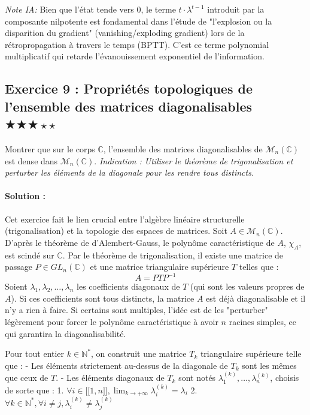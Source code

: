 \documentclass[11pt,a4paper]{article}
\begin{document}
\textit{Note IA:} Bien que l'état tende vers $0$, le terme $t \cdot \lambda^{t-1}$ introduit par la composante nilpotente est fondamental dans l'étude de "l'explosion ou la disparition du gradient" (vanishing/exploding gradient) lors de la rétropropagation à travers le temps (BPTT). C'est ce terme polynomial multiplicatif qui retarde l'évanouissement exponentiel de l'information.

\vspace{1cm}
\subsection*{Exercice 9 : Propriétés topologiques de l'ensemble des matrices diagonalisables $\bigstar\bigstar\bigstar\star\star$}

Montrer que sur le corps $\mathbb{C}$, l'ensemble des matrices diagonalisables de $\mathcal{M}_n(\mathbb{C})$ est dense dans $\mathcal{M}_n(\mathbb{C})$.
\textit{Indication : Utiliser le théorème de trigonalisation et perturber les éléments de la diagonale pour les rendre tous distincts.}

\paragraph*{Solution :}

Cet exercice fait le lien crucial entre l'algèbre linéaire structurelle (trigonalisation) et la topologie des espaces de matrices.
Soit $A \in \mathcal{M}_n(\mathbb{C})$.
D'après le théorème de d'Alembert-Gauss, le polynôme caractéristique de $A$, $\chi_A$, est scindé sur $\mathbb{C}$.
Par le théorème de trigonalisation, il existe une matrice de passage $P \in GL_n(\mathbb{C})$ et une matrice triangulaire supérieure $T$ telles que :
$$ A = P T P^{-1} $$
Soient $\lambda_1, \lambda_2, \ldots, \lambda_n$ les coefficients diagonaux de $T$ (qui sont les valeurs propres de $A$).
Si ces coefficients sont tous distincts, la matrice $A$ est déjà diagonalisable et il n'y a rien à faire.
Si certains sont multiples, l'idée est de les "perturber" légèrement pour forcer le polynôme caractéristique à avoir $n$ racines simples, ce qui garantira la diagonalisabilité.

Pour tout entier $k \in \mathbb{N}^*$, on construit une matrice $T_k$ triangulaire supérieure telle que :
- Les éléments strictement au-dessus de la diagonale de $T_k$ sont les mêmes que ceux de $T$.
- Les éléments diagonaux de $T_k$ sont notés $\lambda_{1}^{(k)}, \ldots, \lambda_{n}^{(k)}$, choisis de sorte que :
  1. $\forall i \in \mathopen{[\![} 1, n \mathclose{]\!]}, \lim_{k \to +\infty} \lambda_{i}^{(k)} = \lambda_i$
  2. $\forall k \in \mathbb{N}^*, \forall i \neq j, \lambda_{i}^{(k)} \neq \lambda_{j}^{(k)}$
\end{document}
